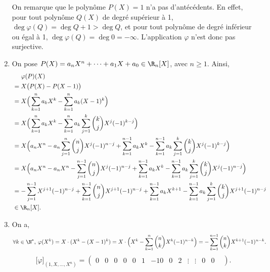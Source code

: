 \begin{enumerate}
		On remarque que le polynôme $P(X) = 1$\/ n'a pas d'antécédents. En effet, pour tout polynôme $Q(X)$ de degré supérieur à 1, $\deg \varphi(Q) = \deg Q + 1 > \deg Q$, et pour tout polynôme de degré inférieur ou égal à 1, $\deg \varphi(Q) = \deg 0 = -\infty$. L'application $\varphi$\/ n'est donc pas surjective.
	\item
		On pose $P(X) = a_n X^n + \cdots + a_1 X + a_0 \in \R_n[X]$, avec $n \ge 1$.
		Ainsi,
		\begin{align*}
			&\mathrel{\phantom=}\varphi(P)(X)\\
			&= X\big(P(X) - P(X-1)\big) \\
			&= X \Big(\sum_{k=1}^n a_k X^k - \sum_{k=1}^n a_k (X-1)^k\Big) \\
			&= X \Big(\sum_{k=1}^n a_k X^k - \sum_{k=1}^n a_k \sum_{j=1}^k {k\choose j} X^j (-1)^{k-j}\Big) \\
			&= X \Big(a_n X^n - a_n\sum_{j=1}^n {n\choose j} X^j (-1)^{n-j} + \sum_{k=1}^{n-1} a_k X^k - \sum_{k=1}^{n-1} a_k \sum_{j=1}^k {k\choose j} X^j (-1)^{k-j} \Big)\\
			&= X\Big(a_n X^n - a_n X^n - \sum_{j=1}^{n-1} {n\choose j} X^j (-1)^{n-j} + \sum_{k=1}^{n-1} a_k X^k - \sum_{k=1}^{n-1} a_k \sum_{j=1}^k {k\choose j} X^j (-1)^{n-j} \Big) \\
			&= -\sum_{j=1}^{n-1} X^{j+1} (-1)^{n-j} + \sum_{k=1}^{n-1} {n\choose j} X^{j+1} (-1)^{n-j} + \sum_{k=1}^{n-1} a_k X^{k+1} - \sum_{k=1}^{n-1} a_k \sum_{j=1}^{k} {k\choose j} X^{j+1} (-1)^{n-j} \\
			&\in \R_n[X].
		\end{align*}
	\item {}
		On a, \[
			\forall k \in \N^*,\:\varphi(X^k) = X \cdot (X^k - (X-1)^k) = X \cdot \Big(X^k - \sum_{k=1}^n {n \choose k} X^k (-1)^{n-k}\Big) = -\sum_{k=1}^{n-1} {n\choose k} X^{k+1} (-1)^{n-k}
		.\]
		\[
			\big[\varphi\big]_{(1, X, \ldots, X^n)} =
			\begin{pmatrix}%
				0&0&0&0&
				0&1&-1
				0&0&2&
				\vdots&\vdots&
				0&0&
			\end{pmatrix}
		.\] 
\end{enumerate}

